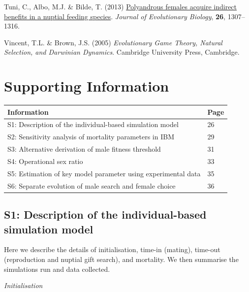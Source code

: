 \documentclass[
]{article}
\newlength{\cslhangindent}
\newlength{\cslentryspacingunit} %
\newenvironment{CSLReferences}[2] %
 {%
  \setlength{\parindent}{0pt}
  \ifodd #1
  \let\oldpar\par
  \def\par{\hangindent=\cslhangindent\oldpar}
  \fi
  \setlength{\parskip}{#2\cslentryspacingunit}
 }%
 {}
\begin{document}
\begin{CSLReferences}{0}{0}
\leavevmode{}%
Tuni, C., Albo, M.J. \& Bilde, T. (2013)
\href{https://doi.org/10.1111/jeb.12137}{{Polyandrous females acquire
indirect benefits in a nuptial feeding species}}. \emph{Journal of
Evolutionary Biology}, \textbf{26}, 1307--1316.

\leavevmode{}%
Vincent, T.L. \& Brown, J.S. (2005) \emph{{Evolutionary Game Theory,
Natural Selection, and Darwinian Dynamics}}. Cambridge University Press,
Cambridge.

\end{CSLReferences}

\clearpage

\hypertarget{supporting-information}{%
\section{Supporting Information}\label{supporting-information}}

\begin{longtable}[]{@{}ll@{}}
\toprule
Information & Page \\
\midrule
\endhead
S1: Description of the individual-based simulation model & 26 \\
S2: Sensitivity analysis of mortality parameters in IBM & 29 \\
S3: Alternative derivation of male fitness threshold & 31 \\
S4: Operational sex ratio & 33 \\
S5: Estimation of key model parameter using experimental data & 35 \\
S6: Separate evolution of male search and female choice & 36 \\
\bottomrule
\end{longtable}

\clearpage

\hypertarget{s1-description-of-the-individual-based-simulation-model}{%
\subsection{S1: Description of the individual-based simulation
model}\label{s1-description-of-the-individual-based-simulation-model}}

Here we describe the details of initialisation, time-in (mating),
time-out (reproduction and nuptial gift search), and mortality. We then
summarise the simulations run and data collected.

\emph{Initialisation}
\end{document}

